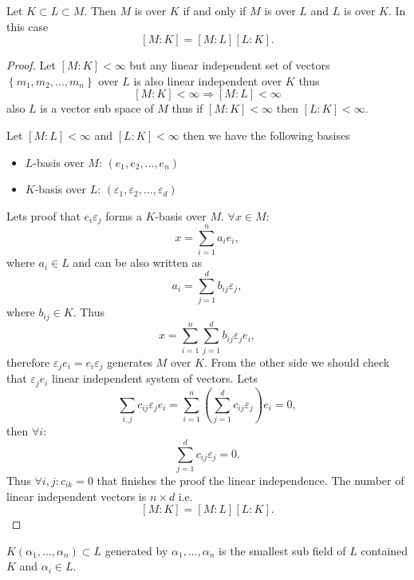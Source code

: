 \begin{theorem}
  Let $K \subset L \subset M$. Then $M$ is
   over $K$ if and only if
  $M$ is  over $L$ and
  $L$ is  over $K$. In this case
  \[
  \left[M:K\right] = \left[M:L\right] \left[L:K\right].
  \]
  \begin{proof}
    Let $\left[M:K\right] < \infty$ but any linear independent set of
    vectors  $\left\{m_1, m_2, \dots, m_n\right\}$ over $L$ is also
    linear independent over $K$ thus
    \[
    \left[M:K\right] < \infty \Rightarrow \left[M:L\right] < \infty
    \]
    also $L$ is a vector sub space of $M$ thus if
    $\left[M:K\right] < \infty$ then $\left[L:K\right] < \infty$.

    Let $\left[M:L\right] < \infty$ and $\left[L:K\right] < \infty$
    then we have the following basises
    \begin{itemize}
    \item $L$-basis over $M$: $\left(e_1, e_2, \dots, e_n\right)$
    \item $K$-basis over $L$:
      $\left(\varepsilon_1, \varepsilon_2, \dots, \varepsilon_d\right)$
    \end{itemize}
    Lets proof that $e_i\varepsilon_j$ forms a $K$-basis over $M$.
    $\forall x \in M$:
    \[
    x = \sum_{i=1}^n a_i e_i, 
    \]
    where $a_i \in L$ and can be also written as
    \[
    a_i = \sum_{j=1}^d b_{ij} \varepsilon_j,
    \]
    where $b_{ij} \in K$.
    Thus
    \[
    x = \sum_{i=1}^n \sum_{j=1}^d b_{ij} \varepsilon_j e_i, 
    \]
    therefore $\varepsilon_j e_i = e_i \varepsilon_j$ generates $M$
    over $K$. From the other side we should check that $\varepsilon_j
    e_i$ linear independent system of vectors. Lets
    \[
    \sum_{i,j} c_{ij} \varepsilon_j e_i =
    \sum_{i=1}^n \left( \sum_{j=1}^d c_{ij} \varepsilon_j \right) e_i = 0,
    \]
    then $\forall i$:
    \[
    \sum_{j=1}^d c_{ij} \varepsilon_j = 0.
    \]
    Thus $\forall i,j: c_{ik} = 0$ that finishes the proof the linear
    independence.   
    The number of linear independent vectors is $n \times d$ i.e.
    \[
    \left[M:K\right] = \left[M:L\right] \left[L:K\right].
    \]
  \end{proof}
  \label{thm:mulformuladegrees}
\end{theorem}

\begin{definition}
  $K\left(\alpha_1, \dots, \alpha_n\right) \subset L$ generated by
  $\alpha_1, \dots, \alpha_n$ is the smallest sub field of $L$
  contained  $K$ and $\alpha_i \in L$.
\end{definition}

